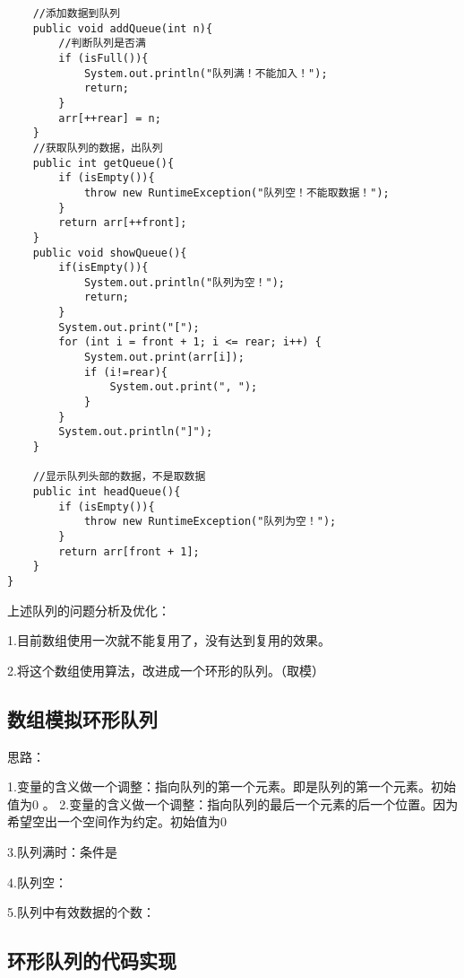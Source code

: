 \documentclass[a4paper]{report}
\begin{document}
\begin{lstlisting}
    //添加数据到队列
    public void addQueue(int n){
        //判断队列是否满
        if (isFull()){
            System.out.println("队列满！不能加入！");
            return;
        }
        arr[++rear] = n;
    }
    //获取队列的数据，出队列
    public int getQueue(){
        if (isEmpty()){
            throw new RuntimeException("队列空！不能取数据！");
        }
        return arr[++front];
    }
    public void showQueue(){
        if(isEmpty()){
            System.out.println("队列为空！");
            return;
        }
        System.out.print("[");
        for (int i = front + 1; i <= rear; i++) {
            System.out.print(arr[i]);
            if (i!=rear){
                System.out.print(", ");
            }
        }
        System.out.println("]");
    }

    //显示队列头部的数据，不是取数据
    public int headQueue(){
        if (isEmpty()){
            throw new RuntimeException("队列为空！");
        }
        return arr[front + 1];
    }
}

\end{lstlisting}

上述队列的问题分析及优化：

1.目前数组使用一次就不能复用了，没有达到复用的效果。

2.将这个数组使用算法，改进成一个环形的队列。（取模）
\subsection{数组模拟环形队列}
思路：

1.变量的含义做一个调整：指向队列的第一个元素。即是队列的第一个元素。初始值为0
。
2.变量的含义做一个调整：指向队列的最后一个元素的后一个位置。因为希望空出一个空间作为约定。初始值为0

3.队列满时：条件是

4.队列空：

5.队列中有效数据的个数：

\subsection{环形队列的代码实现}
\end{document}
